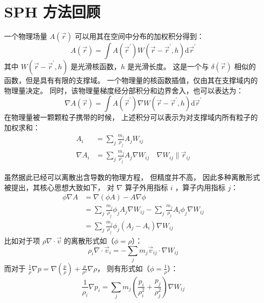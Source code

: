 \section{SPH 方法回顾}

\begin{frame}
    一个物理场量 $A(\vec{r})$ 可以用其在空间中分布的加权积分得到：
    \begin{equation}
        A(\vec{r}) = \int A(\vec{r}^\prime) W(\vec{r} - \vec{r}^\prime, h) \mathrm{d} \vec{r}^\prime
    \end{equation}
    其中 $W(\vec{r} - \vec{r}^\prime, h)$ 是光滑核函数，$h$ 是光滑长度。
    这是一个与 $\delta(\vec{r})$ 相似的函数，但是具有有限的支撑域。
    一个物理量的核函数插值，仅由其在支撑域内的物理量决定。
    同时，该物理量梯度经分部积分和边界舍入，也可以表达为：
    \begin{equation}
        \nabla A(\vec{r}) = \int A(\vec{r}^\prime) \nabla W(\vec{r} - \vec{r}^\prime, h) \mathrm{d} \vec{r}^\prime
    \end{equation}
    在物理量被一颗颗粒子携带的时候，
    上述积分可以表示为对支撑域内所有粒子的加权求和：
    \begin{equation}
        \begin{aligned}
            A_i &= \sum_j \frac{m_j}{\rho_j} A_j W_{ij} \\
            \nabla A_i &= \sum_j \frac{m_j}{\rho_j} A_j \nabla W_{ij}
            \quad \nabla W_{ij} \parallel \vec{r}_{ij}
        \end{aligned}
    \end{equation}
\end{frame}

\begin{frame}
    虽然据此已经可以离散出含导数的物理方程，
    但精度并不高，
    因此多种离散形式被提出，其核心思想大致如下，
    对 $\nabla$ 算子外用指标 $i$ ，算子内用指标 $j$：
    \begin{equation}
        \begin{aligned}
            \phi \nabla A &= \nabla (\phi A) - A \nabla \phi\\
            &= \sum_j \frac{m_j}{\rho_j} \phi_j A_j \nabla W_{ij}
            - \sum_j \frac{m_j}{\rho_j} A_i \phi_j \nabla W_{ij}\\
            &= \sum_j \frac{m_j}{\rho_j} \phi_j (A_j - A_i) \nabla W_{ij}
        \end{aligned}
    \end{equation}
    比如对于项 $\rho\nabla\cdot \vec{v}$ 的离散形式如（$\phi=\rho$）：
    \begin{equation}
        \rho_i \nabla \cdot \vec{v}_i = -\sum_j m_j \vec{v}_{ij} \cdot \nabla W_{ij}
    \end{equation}
    而对于 $\frac{1}{\rho}\nabla p = \nabla \left(\frac{p}{\rho}\right) + \frac{p}{\rho^2}\nabla \rho$，
    则有形式如（$\phi=\frac{1}{\rho}$）：
    \begin{equation}
        \frac{1}{\rho_i}\nabla p_i = \sum_j m_j \left(\frac{p_i}{\rho_i^2} + \frac{p_j}{\rho_j^2}\right) \nabla W_{ij}
    \end{equation}
\end{frame}

